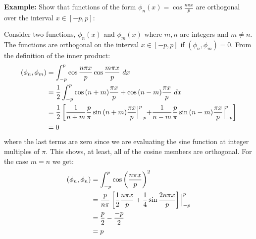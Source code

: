 \vspace{1.0cm}

\noindent\textbf{Example:} Show that functions of the form $\phi_n(x) = \cos{\frac{n\pi x}{p}}$ are orthogonal over the interval $x \in [-p,p]$:

\vspace{0.5cm}
\noindent Consider two functions, $\phi_n(x)$ and $\phi_m(x)$ where $m,n$ are integers and $m \ne n$.  The functions are orthogonal on the interval $x\in [-p,p]$ if $(\phi_n,\phi_m) = 0$.  From the definition of the inner product:
\begin{align*}
(\phi_n,\phi_m) &= \int_{-p}^{p} \cos{\frac{n \pi x}{p}} \cos{\frac{m \pi x}{p}} \ dx \\
&= \frac{1}{2}\int_{-p}^{p} \cos{(n+m)\frac{\pi x}{p}} + \cos{(n-m)\frac{\pi x}{p}} \ dx \\
&= \frac{1}{2} \left[\frac{1}{n+m} \frac{p}{\pi}\sin{(n+m)\frac{\pi x}{p}}\Bigl|_{-p}^{p} + \frac{1}{n-m}\frac{p}{\pi}\sin{(n-m)\frac{\pi x}{p}}\Bigl|_{-p}^{p} \right] \\
&=0
\end{align*}
where the last terms are zero since we are evaluating the sine function at integer multiples of $\pi$.  This shows, at least, all of the cosine members are orthogonal.  For the case $m=n$ we get:
\begin{align*}
\left(\phi_n,\phi_n \right) &= \int_{-p}^{p} \cos{\left(\frac{n \pi x}{p} \right)}^2 \\
&= \frac{p}{n \pi} \left[\frac{1}{2}\frac{n \pi x}{p} + \frac{1}{4} \sin{\frac{2 n \pi x}{p}} \right]\Bigl|_{-p}^{p} \\
&= \frac{p}{2} - \frac{-p}{2} \\
&= p
\end{align*}

